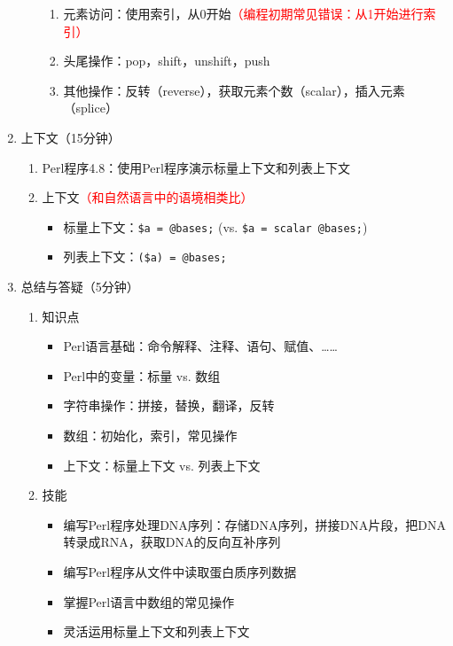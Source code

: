 \documentclass{TIJMUjiaoanLL}
\begin{document}
\begin{enumerate}
\begin{enumerate}
\begin{enumerate}
	  \item 元素访问：使用索引，从0开始\textcolor{red}{（编程初期常见错误：从1开始进行索引）}
	  \item 头尾操作：pop，shift，unshift，push
	  \item 其他操作：反转（reverse），获取元素个数（scalar），插入元素（splice）
	\end{enumerate}
    \end{enumerate}
  \item 上下文（15分钟）
    \begin{enumerate}
      \item Perl程序4.8：使用Perl程序演示标量上下文和列表上下文
      \item 上下文\textcolor{red}{（和自然语言中的语境相类比）}
	\begin{itemize}
	  \item 标量上下文：\verb|$a = @bases;| (vs. \verb|$a = scalar @bases;|)
	  \item 列表上下文：\verb|($a) = @bases;|
	\end{itemize}
    \end{enumerate}
  \item 总结与答疑（5分钟）
    \begin{enumerate}
      \item 知识点
	\begin{itemize}
	  \item Perl语言基础：命令解释、注释、语句、赋值、……
	  \item Perl中的变量：标量 vs. 数组
	  \item 字符串操作：拼接，替换，翻译，反转
	  \item 数组：初始化，索引，常见操作
	  \item 上下文：标量上下文 vs. 列表上下文
	\end{itemize}
      \item 技能
	\begin{itemize}
	  \item 编写Perl程序处理DNA序列：存储DNA序列，拼接DNA片段，把DNA转录成RNA，获取DNA的反向互补序列
	  \item 编写Perl程序从文件中读取蛋白质序列数据
	  \item 掌握Perl语言中数组的常见操作
	  \item 灵活运用标量上下文和列表上下文
	\end{itemize}
    \end{enumerate}
\end{enumerate}

\otherTail

\end{document}
